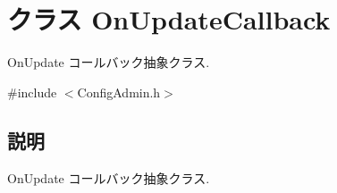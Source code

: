 \section{クラス OnUpdateCallback}
\label{classOnUpdateCallback}


OnUpdate コールバック抽象クラス.  




{\ttfamily \#include $<$ConfigAdmin.h$>$}



\subsection{説明}
OnUpdate コールバック抽象クラス. 